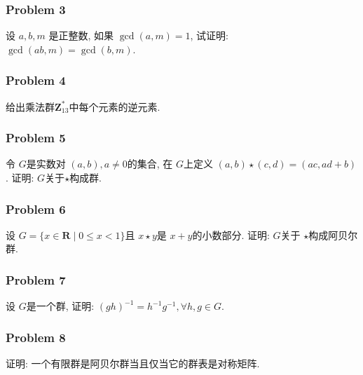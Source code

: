 \documentclass[a4paper,12pt]{ctexart}
\newcommand{\Z}{\mathbf{Z}}
\newcommand{\R}{\mathbf{R}}
\begin{document}
\subsubsection*{Problem 3}
    设 $ a,b,m $ 是正整数, 如果 $ \gcd(a,m)=1 $, 试证明: $ \gcd(ab,m)=\gcd(b,m) $.
\subsubsection*{Problem 4}
    给出乘法群$ \Z_{13}^* $中每个元素的逆元素.
\subsubsection*{Problem 5}
    令 $ G $是实数对 $ (a,b),a\neq 0 $的集合, 在 $ G $上定义 
    $ (a,b)\star (c,d)=(ac,ad+b) $. 证明: $G$关于$ \star $构成群.
\subsubsection*{Problem 6}
    设 $ G=\{x\in \R\mid 0\leq x<1\} $且 $ x\star y $是 $ x+y $的小数部分.
    证明: $ G $关于 $ \star $构成阿贝尔群.
\subsubsection*{Problem 7}
    设 $ G $是一个群, 证明: $ (gh)^{-1}=h^{-1}g^{-1},\forall h,g\in G $.
\subsubsection*{Problem 8}
    证明: 一个有限群是阿贝尔群当且仅当它的群表是对称矩阵.
\end{document}
